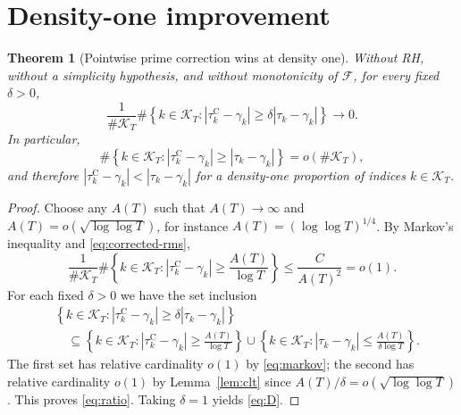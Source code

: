 \documentclass[11pt,a4paper]{article}
\newtheorem{theorem}{Theorem}
\newcommand{\KK}{\mathcal K_T}
\begin{document}
\section*{Density-one improvement}
\begin{theorem}[Pointwise prime correction wins at density one]\label{thm:D}
Without RH, without a simplicity hypothesis, and without monotonicity of $\mathcal F$, for every fixed $\delta>0$,
\begin{equation}
\frac1{\#\KK}
\#\left\{k\in\KK:
|\tau_k^{\mathrm C}-\gamma_k|\ge
\delta|\tau_k-\gamma_k|\right\}
\longrightarrow0.
\label{eq:ratio}
\end{equation}
In particular,
\begin{equation}
\#\left\{k\in\KK:
|\tau_k^{\mathrm C}-\gamma_k|\ge|\tau_k-\gamma_k|\right\}
=o(\#\KK),
\label{eq:D}
\end{equation}
and therefore $|\tau_k^{\mathrm C}-\gamma_k|<|\tau_k-\gamma_k|$ for a density-one proportion of indices $k\in\KK$.
\end{theorem}
\begin{proof}
Choose any $A(T)$ such that $A(T)\to\infty$ and
$A(T)=o(\sqrt{\log\log T})$, for instance
$A(T)=(\log\log T)^{1/4}$.
By Markov's inequality and \eqref{eq:corrected-rms},
\begin{equation}
\frac1{\#\KK}\#\left\{k\in\KK:
|\tau_k^{\mathrm C}-\gamma_k|\ge\frac{A(T)}{\log T}\right\}
\le\frac{C}{A(T)^2}=o(1).
\label{eq:markov}
\end{equation}
For each fixed $\delta>0$ we have the set inclusion
\begin{align*}
&\left\{k\in\KK:
|\tau_k^{\mathrm C}-\gamma_k|\ge
\delta|\tau_k-\gamma_k|\right\}\\
&\quad\subseteq\left\{k\in\KK:
|\tau_k^{\mathrm C}-\gamma_k|\ge\frac{A(T)}{\log T}\right\}
\cup\left\{k\in\KK:
|\tau_k-\gamma_k|\le\frac{A(T)}{\delta\log T}\right\}.
\end{align*}
The first set has relative cardinality $o(1)$ by \eqref{eq:markov}; the second has relative cardinality $o(1)$ by Lemma~\ref{lem:clt} since $A(T)/\delta=o(\sqrt{\log\log T})$. This proves \eqref{eq:ratio}. Taking $\delta=1$ yields \eqref{eq:D}.
\end{proof}
\end{document}
